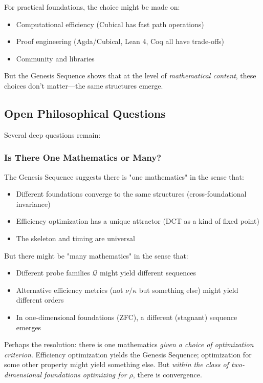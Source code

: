 \documentclass[11pt]{article}
\theoremstyle{definition}
\begin{document}
For practical foundations, the choice might be made on:
\begin{itemize}
\item Computational efficiency (Cubical has fast path operations)
\item Proof engineering (Agda/Cubical, Lean 4, Coq all have trade-offs)
\item Community and libraries
\end{itemize}

But the Genesis Sequence shows that at the level of \emph{mathematical content}, these choices don't matter—the same structures emerge.

\subsection{Open Philosophical Questions}

Several deep questions remain:

\subsubsection{Is There One Mathematics or Many?}

The Genesis Sequence suggests there is "one mathematics" in the sense that:
\begin{itemize}
\item Different foundations converge to the same structures (cross-foundational invariance)
\item Efficiency optimization has a unique attractor (DCT as a kind of fixed point)
\item The skeleton and timing are universal
\end{itemize}

But there might be "many mathematics" in the sense that:
\begin{itemize}
\item Different probe families $\mathcal{Q}$ might yield different sequences
\item Alternative efficiency metrics (not $\nu/\kappa$ but something else) might yield different orders
\item In one-dimensional foundations (ZFC), a different (stagnant) sequence emerges
\end{itemize}

Perhaps the resolution: there is one mathematics \emph{given a choice of optimization criterion}. Efficiency optimization yields the Genesis Sequence; optimization for some other property might yield something else. But \emph{within the class of two-dimensional foundations optimizing for $\rho$}, there is convergence.
\end{document}
